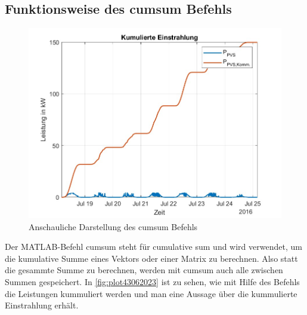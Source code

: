 \subsection{Funktionsweise des cumsum Befehls}
\begin{figure}[H]
    \centering
    \includegraphics[width=\textwidth]{Abbildungen/plot_vorbereitungsfrage4.jpg}
    \caption{Anschauliche Darstellung des cumsum Befehls}
    \label{fig:plot43062023}
\end{figure}
Der MATLAB-Befehl cumsum steht für cumulative sum und wird verwendet, um die kumulative Summe eines Vektors oder einer Matrix zu berechnen. 
Also statt die gesammte Summe zu berechnen, werden mit cumsum auch alle zwischen Summen gespeichert. In \autoref{fig:plot43062023} ist zu sehen, wie mit Hilfe des Befehls die Leistungen kummuliert werden und man eine Aussage über die kummulierte Einstrahlung erhält.